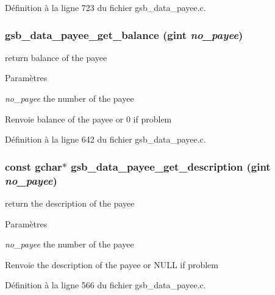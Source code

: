 Définition à la ligne 723 du fichier gsb\_\-data\_\-payee.c.

\subsubsection[{gsb\_\-data\_\-payee\_\-get\_\-balance}]{ gsb\_\-data\_\-payee\_\-get\_\-balance (gint {\em no\_\-payee})}\label{gsb__data__payee_8h_a4d9141bf920954170d54a7a8d9127d4f}
return balance of the payee


\begin{DoxyParams}{Paramètres}
\item[{\em no\_\-payee}]the number of the payee\end{DoxyParams}
\begin{DoxyReturn}{Renvoie}
balance of the payee or 0 if problem 
\end{DoxyReturn}


Définition à la ligne 642 du fichier gsb\_\-data\_\-payee.c.

\subsubsection[{gsb\_\-data\_\-payee\_\-get\_\-description}]{\setlength{\rightskip}{0pt plus 5cm}const gchar$\ast$ gsb\_\-data\_\-payee\_\-get\_\-description (gint {\em no\_\-payee})}\label{gsb__data__payee_8h_a0b399cb8a65b9225323207be946c0d10}
return the description of the payee


\begin{DoxyParams}{Paramètres}
\item[{\em no\_\-payee}]the number of the payee\end{DoxyParams}
\begin{DoxyReturn}{Renvoie}
the description of the payee or NULL if problem 
\end{DoxyReturn}


Définition à la ligne 566 du fichier gsb\_\-data\_\-payee.c.

